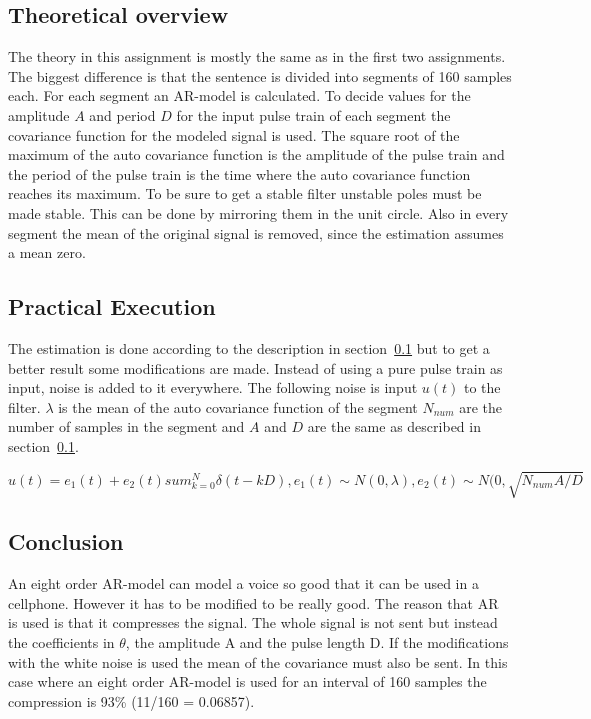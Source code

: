 \documentclass[12pt]{article}
\begin{document}
\subsection{Theoretical overview}
\label{Theo}
The theory in this assignment is mostly the same as in the first two assignments.
The biggest difference is that the sentence is divided into segments of 160 samples each. 
For each segment an AR-model is calculated. 
To decide values for the amplitude $A$ and period $D$ for the input pulse train of each segment the covariance function for the modeled signal is used. 
The square root of the maximum of the auto covariance function is the amplitude of the pulse train and the period of the pulse train is the time where the auto covariance function reaches its maximum. 
To be sure to get a stable filter unstable poles must be made stable. 
This can be done by mirroring them in the unit circle. 
Also in every segment the mean of the original signal is removed, since the estimation assumes a mean zero.  

\subsection{Practical Execution}
The estimation is done according to the description in section~\ref{Theo} but to get a better result some modifications are made.
Instead of using a pure pulse train as input, noise is added to it everywhere.
The following noise is input $u(t)$ to the filter.
$\lambda$ is the mean of the auto covariance function of the segment $N_{num}$ are the number of samples in the segment and $A$ and $D$ are the same as described in section~\ref{Theo}. 

\[
  u(t)= e_1(t)+e_2(t)sum_{k=0} ^N \delta(t-kD),
e_1(t)\sim N(0,\lambda),e_2(t)\sim N(0,\sqrt{N_{num}A/D}
\]

\subsection{Conclusion}
An eight order AR-model can model a voice so good that it can be used in a cellphone.
However it has to be modified to be really good.
The reason that AR is used is that it compresses the signal.
The whole signal is not sent but instead the coefficients in $\theta$, the amplitude A and the pulse length D.
If the modifications with the white noise is used the mean of the covariance must also be sent.
In this case where an eight order AR-model is used for an interval of 160 samples the compression is 93\% (11/160 = 0.06857). 
\end{document}
